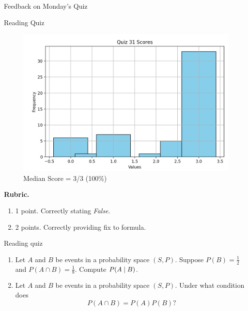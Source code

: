 \documentclass[10pt]{beamer}
\begin{document}
\begin{frame}[standout]
Feedback on Monday's Quiz
\end{frame}

\begin{frame}{Reading Quiz}
\footnotesize 
\begin{figure}[ht]
        \centering
        \includegraphics[width=.7\textwidth]{images/reading_quiz_scores}
   		 \caption{Median Score = 3/3 (100\%)}
\end{figure}
\vfill 
\textbf{Rubric.}  	
\begin{enumerate}
\item 1 point.  Correctly stating \textit{False}.
\item 2 points. Correctly providing fix to formula.
\end{enumerate}
\end{frame}	


\begin{frame}[standout]
Reading quiz
\end{frame}

\begin{frame}

\begin{mygreenbox}[title=\text{Reading Quiz (Conditional Probability and Independence)}]

\begin{enumerate}
\item Let $A$ and $B$ be events in a probability space $(S,P)$.   Suppose $P(B) = \frac{1}{2}$ and $P(A \cap B) = \frac{1}{8}$.  Compute $P(A \; | \; B)$.
\item Let $A$ and $B$ be events in a probability space $(S,P)$.  Under what condition does
\[ P(A \cap B) = P(A) P(B)?\]
\end{enumerate}

\end{mygreenbox}
	
\end{frame}
\end{document}
